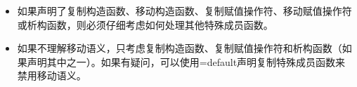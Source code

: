 \begin{itemize}
	\item 如果声明了复制构造函数、移动构造函数、复制赋值操作符、移动赋值操作符或析构函数，则必须仔细考虑如何处理其他特殊成员函数。
	\item 如果不理解移动语义，只考虑复制构造函数、复制赋值操作符和析构函数（如果声明其中之一）。如果有疑问，可以使用=default声明复制特殊成员函数来禁用移动语义。
\end{itemize}






















































